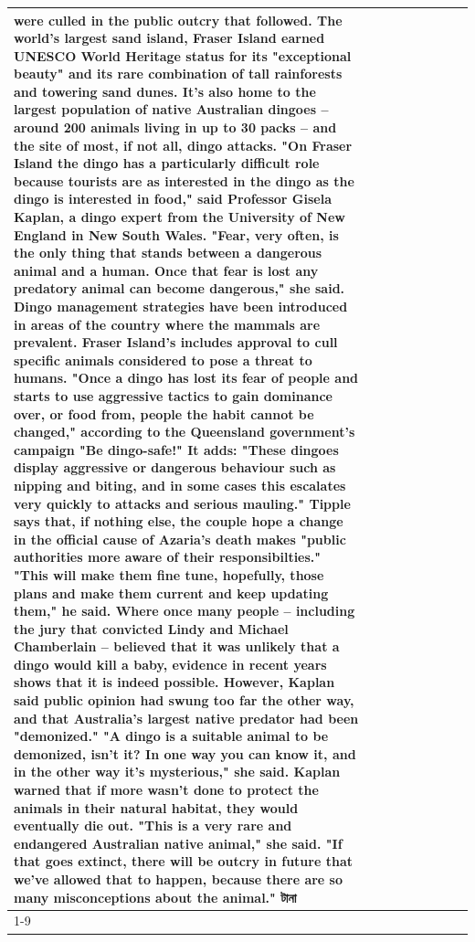 \begin{table}[H]
\begin{tabular}{lllrlllll}
were culled in the public outcry that followed. The world's largest sand island, Fraser Island earned UNESCO World Heritage status for its "exceptional beauty" and its rare combination of tall rainforests and towering sand dunes. It's also home to the largest population of native Australian dingoes -- around 200 animals living in up to 30 packs -- and the site of most, if not all, dingo attacks. "On Fraser Island the dingo has a particularly difficult role because tourists are as interested in the dingo as the dingo is interested in food," said Professor Gisela Kaplan, a dingo expert from the University of New England in New South Wales. "Fear, very often, is the only thing that stands between a dangerous animal and a human. Once that fear is lost any predatory animal can become dangerous," she said. Dingo management strategies have been introduced in areas of the country where the mammals are prevalent. Fraser Island's includes approval to cull specific animals considered to pose a threat to humans. "Once a dingo has lost its fear of people and starts to use aggressive tactics to gain dominance over, or food from, people the habit cannot be changed," according to the Queensland government's campaign "Be dingo-safe!" It adds: "These dingoes display aggressive or dangerous behaviour such as nipping and biting, and in some cases this escalates very quickly to attacks and serious mauling." Tipple says that, if nothing else, the couple hope a change in the official cause of Azaria's death makes "public authorities more aware of their responsibilties." "This will make them fine tune, hopefully, those plans and make them current and keep updating them," he said. Where once many people -- including the jury that convicted Lindy and Michael Chamberlain -- believed that it was unlikely that a dingo would kill a baby, evidence in recent years shows that it is indeed possible. However, Kaplan said public opinion had swung too far the other way, and that Australia's largest native predator had been "demonized." "A dingo is a suitable animal to be demonized, isn't it? In one way you can know it, and in the other way it's mysterious," she said. Kaplan warned that if more wasn't done to protect the animals in their natural habitat, they would eventually die out. "This is a very rare and endangered Australian native animal," she said. "If that goes extinct, there will be outcry in future that we've allowed that to happen, because there are so many misconceptions about the animal." টানা \\
\cline{1-9}

\end{tabular}
\end{table}
